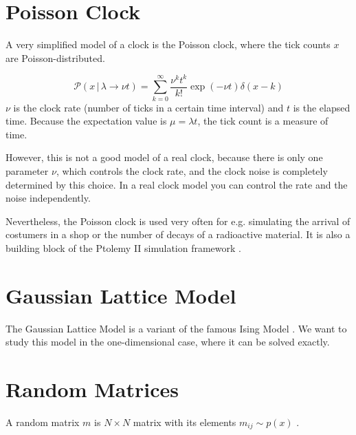 \documentclass{tstextbook}
\begin{document}
\section{Poisson Clock}
A very simplified model of a clock is the Poisson clock, where the tick counts $x$ are Poisson-distributed.

\begin{definition}
  \label{th:poissonclock}
  \begin{equation}
    \mathcal{P}(x\,\vert\, \lambda\rightarrow\nu t)=\sum_{k=0}^{\infty}\frac{\nu^k t^k}{k!}\exp(-\nu t)\delta(x-k)
  \end{equation}
  $\nu$ is the clock rate (number of ticks in a certain time interval) and $t$ is the elapsed time. Because the expectation value is $\mu=\lambda t$, the tick count is a measure of time.
\end{definition}
However, this is not a good model of a real clock, because there is only one parameter $\nu$, which controls the clock rate, and the clock noise is completely determined by this choice. In a real clock model you can control the rate and the noise independently.

Nevertheless, the Poisson clock is used very often for e.g. simulating the arrival of costumers in a shop or the number of decays of a radioactive material. It is also a building block of the Ptolemy II simulation framework \cite{ptolemy2003}. 
\section{Gaussian Lattice Model}
The Gaussian Lattice Model is a variant of the famous Ising Model \cite{mussardo2010}. We want to study this model in the one-dimensional case, where it can be solved exactly.

\section{Random Matrices}
A random matrix $m$ is $N\times N$ matrix with its elements $m_{ij}\sim p(x)$ \cite{livan2017}.


\printbibliography{}


\printindex
\end{document}
